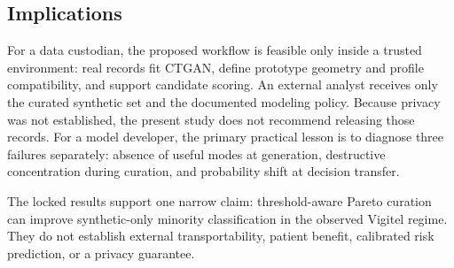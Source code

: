 \subsection{Implications}

For a data custodian, the proposed workflow is feasible only inside a trusted environment: real records fit CTGAN, define prototype geometry and profile compatibility, and support candidate scoring. An external analyst receives only the curated synthetic set and the documented modeling policy. Because privacy was not established, the present study does not recommend releasing those records. For a model developer, the primary practical lesson is to diagnose three failures separately: absence of useful modes at generation, destructive concentration during curation, and probability shift at decision transfer.

The locked results support one narrow claim: threshold-aware Pareto curation can improve synthetic-only minority classification in the observed Vigitel regime. They do not establish external transportability, patient benefit, calibrated risk prediction, or a privacy guarantee.
